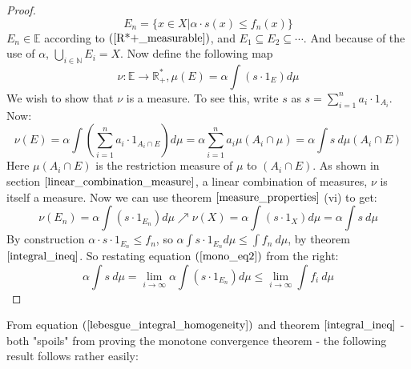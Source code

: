 \documentclass[12pt, a4paper]{article}
\numberwithin{equation}{section}
\begin{document}
\begin{proof}
\begin{equation}
E_n=\{x\in X|\alpha\cdot s(x)\le f_n(x)\}
\end{equation}
$E_n\in\mathbb{E}$ according to $(\ref{R*+_measurable})$, and $E_1\subseteq E_2\subseteq\cdots$. And because of the use of $\alpha$, $\bigcup_{i\in\mathbb{N}}E_i=X$. Now define the following map
\begin{equation}
\nu:\mathbb{E}\rightarrow\mathbb{R}^*_+,\mu(E)=\alpha\int(s\cdot 1_E)d\mu
\end{equation}
We wish to show that $\nu$ is a measure. To see this, write $s$ as $s=\sum_{i=1}^n a_i\cdot 1_{A_i}$. Now:
\begin{equation}
\nu(E)=\alpha\int\left(\sum_{i=1}^n a_i\cdot 1_{A_i\cap E}\right)d\mu=\alpha\sum_{i=1}^n a_i\mu(A_i\cap\mu)=\alpha\int s\ d\mu(A_i\cap E)
\end{equation}
Here $\mu(A_i\cap E)$ is the restriction measure of $\mu$ to $(A_i\cap E)$. As shown in section $\ref{linear_combination_measure}$, a linear combination of measures, $\nu$ is itself a measure. Now we can use theorem $\ref{measure_properties}$ (vi) to get:
\begin{equation}
\label{mono_eq2}
\nu(E_n)=\alpha\int(s\cdot 1_{E_n})d\mu\nearrow\nu(X)=\alpha\int(s\cdot 1_X)d\mu=\alpha\int s\ d\mu
\end{equation}
By construction $\alpha\cdot s\cdot 1_{E_n}\le f_n$, so $\alpha\int s\cdot 1_{E_n}d\mu\le\int f_n\ d\mu$, by theorem $\ref{integral_ineq}$. So restating equation $(\ref{mono_eq2})$ from the right:
\begin{equation}
\alpha\int s\ d\mu=\underset{i\rightarrow\infty}{\lim}\alpha\int(s\cdot 1_{E_n})d\mu\le\underset{i\rightarrow\infty}{\lim}\int f_i\ d\mu
\end{equation}
\end{proof}

From equation $(\ref{lebesgue_integral_homogeneity})$ and theorem $\ref{integral_ineq}$ - both "spoils" from proving the monotone convergence theorem - the following result follows rather easily:
\end{document}
